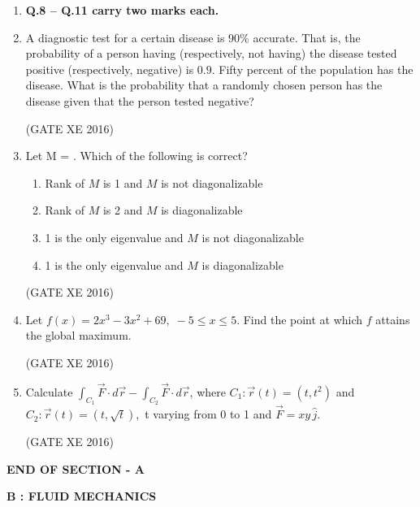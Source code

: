 \documentclass[12pt]{article}
\begin{document}
\begin{enumerate}
\item[] \textbf{Q.8 – Q.11 carry two marks each.}


\item A diagnostic test for a certain disease is $90\%$ accurate. That is, the probability of a person having (respectively, not having) the disease tested positive (respectively, negative) is $0.9$. Fifty percent of the population has the disease. What is the probability that a randomly chosen person has the disease given that the person tested negative?

(GATE XE 2016)

\item Let M = . Which of the following is correct?
\begin{enumerate}
\item Rank of $M$ is 1 and $M$ is not diagonalizable
\item Rank of $M$ is 2 and $M$ is diagonalizable
\item 1 is the only eigenvalue and $M$ is not diagonalizable
\item 1 is the only eigenvalue and $M$ is diagonalizable
\end{enumerate}
(GATE XE 2016)

\item Let $f(x) = 2x^3 - 3x^2 + 69,\;-5 \leq x \leq 5$. Find the point at which $f$ attains the global maximum.

(GATE XE 2016)

\item Calculate $\int_{C_1} \vec{F} \cdot d\vec{r} - \int_{C_2} \vec{F} \cdot d\vec{r}$, where $C_1 : \vec{r}(t) = (t, t^2)$ and $C_2 : \vec{r}(t) = (t, \sqrt{t}),$ \; t  varying from  0 to 1 and $\vec{F} = xy \, \hat{j}$.

(GATE XE 2016)
\end{enumerate}

\begin{center}
    \textbf{END OF SECTION - A}
\end{center}

\newpage

\begin{center}
    {\Large \textbf{B : FLUID MECHANICS}}
\end{center}
\end{document}
